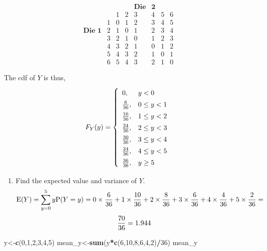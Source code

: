 \documentclass[
]{book}
\newenvironment{Shaded}{\begin{snugshade}}{\end{snugshade}}
\newcommand{\DecValTok}[1]{\textcolor[rgb]{0.00,0.00,0.81}{#1}}
\newcommand{\KeywordTok}[1]{\textcolor[rgb]{0.13,0.29,0.53}{\textbf{#1}}}
\newcommand{\NormalTok}[1]{#1}
\newcommand{\OperatorTok}[1]{\textcolor[rgb]{0.81,0.36,0.00}{\textbf{#1}}}
\providecommand{\tightlist}{%
  \setlength{\itemsep}{0pt}\setlength{\parskip}{0pt}}
\begin{document}
\[
\begin{array}{cc|cccccc} & & & &\textbf{Die} & \textbf{2}
\\ & & 1 & 2 & 3 & 4 & 5 & 6  
\\&\hline 1 & 0 & 1 & 2 & 3 & 4 & 5 
\\\textbf{Die 1} & 2 & 1 & 0 & 1 & 2 &3 & 4  
\\& 3 & 2 & 1 & 0 & 1 & 2 & 3 
\\& 4 & 3 & 2 & 1 & 0 & 1 & 2
\\& 5 & 4 & 3 & 2 & 1 & 0 & 1
\\& 6 & 5 & 4 & 3 & 2 & 1 & 0
\end{array} 
\]

The cdf of \(Y\) is thus,
\[
F_Y(y)=\left\{\renewcommand{\arraystretch}{1.4}
\begin{array}{ll} 0, &  y < 0 \\
\frac{6}{36}, & 0\leq y <1 \\
\frac{16}{36}, & 1\leq y <2 \\
\frac{24}{36}, & 2 \leq y <3 \\
\frac{30}{36}, & 3 \leq y <4 \\
\frac{34}{36}, & 4 \leq y <5 \\
\frac{36}{36}, & y\geq 5 \end{array} \right .
\]

\begin{enumerate}
\def\labelenumi{\alph{enumi}.}
\setcounter{enumi}{3}
\tightlist
\item
  Find the expected value and variance of \(Y\).
  \[
  \mbox{E}(Y)=\sum_{y=0}^5 y\mbox{P}(Y=y) = 0\times {6\over 36} + 1 \times {10\over 36} + 2\times {8\over 36} + 3\times {6\over 36} + 4 \times {4\over 36} + 5 \times {2\over 36} =
  \]
  \[
  {70\over 36} = 1.944
  \]
\end{enumerate}

\begin{Shaded}
\begin{Highlighting}[]
\NormalTok{y<-}\KeywordTok{c}\NormalTok{(}\DecValTok{0}\NormalTok{,}\DecValTok{1}\NormalTok{,}\DecValTok{2}\NormalTok{,}\DecValTok{3}\NormalTok{,}\DecValTok{4}\NormalTok{,}\DecValTok{5}\NormalTok{)}
\NormalTok{mean_y<-}\KeywordTok{sum}\NormalTok{(y}\OperatorTok{*}\KeywordTok{c}\NormalTok{(}\DecValTok{6}\NormalTok{,}\DecValTok{10}\NormalTok{,}\DecValTok{8}\NormalTok{,}\DecValTok{6}\NormalTok{,}\DecValTok{4}\NormalTok{,}\DecValTok{2}\NormalTok{)}\OperatorTok{/}\DecValTok{36}\NormalTok{)}
\NormalTok{mean_y}
\end{Highlighting}
\end{Shaded}
\end{document}
